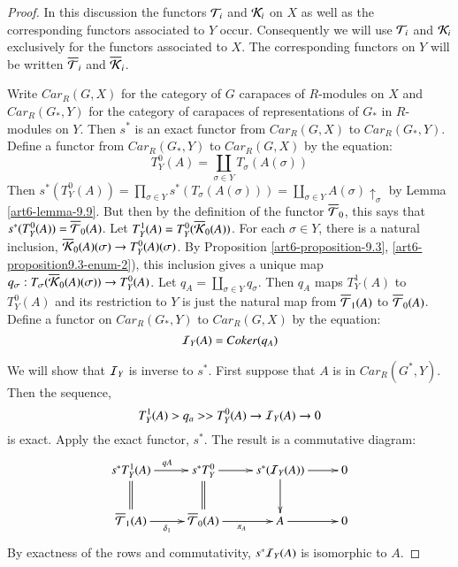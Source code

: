\begin{proof}
In this discussion the functors $\mathcal{T}_{i}$ and $\mathcal{K}_{i}$ on $X$ as well as the corresponding functors associated to $Y$ occur. Consequently we will use $\mathcal{T}_{i}$ and $\mathcal{K}_{i}$ exclusively for the functors associated to $X$. The corresponding functors on $Y$ will be written $\overline{\mathcal{T}}_{i}$ and $ \overline{\mathcal{K}}_{i}$.

Write $C ar_{R}(G, X)$ for the category of $G$ carapaces of $R$-modules on $X$ and $C ar_{R}(G_{*}, Y)$ for the category of carapaces of representations of $G_{*}$ in $R$-modules on $Y$. Then $s^{*}$ is an exact functor from $C ar_{R}(G, X)$ to $C ar_{R}(G_{*}, Y)$. Define a functor from $C ar_{R}(G_{*}, Y)$ to $C ar_{R}(G, X)$ by the equation:
\begin{equation}\label{art6-equation-9.13}
T_{Y}^{0}(A) = \coprod_{\sigma \in Y}T_{\sigma}(A(\sigma))
\end{equation}
Then $s^{*}(T_{Y}^{0}(A)) = \prod_{\sigma \in Y}s^{*}(T_{\sigma}(A(\sigma))) = \coprod_{\sigma \in Y}A(\sigma) \uparrow_{\sigma}$ by Lemma \ref{art6-lemma-9.9}. But then by the definition of the functor $\overline{\mathcal{T}}_{0}$, this says that $s^{*}(T_{Y}^{0}(A)) = \overline{\mathcal{T}}_{0}(A)$. Let $T_{Y}^{1}(A) = T_{Y}^{0}(\overline{\mathcal{K}}_{0}(A))$. For each $\sigma \in Y$, there is a natural inclusion, $\overline{\mathcal{K}}_{0}(A)(\sigma) \rightarrow T_{Y}^{0}(A)(\sigma)$. By Proposition \ref{art6-proposition-9.3}, \ref{art6-proposition9.3-enum-2}), this inclusion gives a unique map $q_{\sigma} : T_{\sigma}(\overline{\mathcal{K}}_{0}(A)(\sigma))\rightarrow T_{Y}^{0}(A)$. Let $q_{A}= \coprod_{\sigma \in Y} q_{\sigma}$. Then $q_{A}$ maps $T_{Y}^{1}(A)$ to $T_{Y}^{0}(A)$ and its restriction to $Y$ is just the natural map from $\overline{\mathcal{T}}_{1}(A)$ to $\overline{\mathcal{T}}_{0}(A)$. Define a functor on $C ar_{R}(G_{*}, Y)$ to $C ar_{R}(G, X)$ by the equation:
\begin{equation}\label{art6-eq-9.14}
\mathcal{I}_{Y}(A)= Coker(q_{A})
\end{equation}

We will show that $\mathcal{I}_{Y}$ is inverse to $s^{*}$. First suppose that $A$ is in $Car_{R}(G^{*}, Y)$. Then the sequence,
$$
T_{Y}^{1}(A) > q_{a}>>T_{Y}^{0}(A) \rightarrow \mathcal{I}_{Y}(A)\rightarrow 0
$$
is exact. Apply the exact functor, $s^{*}$. The result is a commutative diagram:
$$
\xymatrix{
s^{*}T_{Y}^{1}(A)\ar@{=}[d]\ar[r]^{qA} & s^{*}T_{Y}^{0}\ar@{=}[d] \ar [r] & s^{*}(\calI_{Y}(A)) \ar[r]\ar[d] & 0\\
\overline{\calT}_{1}(A) \ar [r]_{\delta_{1}} & \overline{\calT}_{0}(A) \ar[r]_{\pi_{A}} & A \ar [r] & 0
}
$$
By exactness of the rows and commutativity, $s^{*}\mathcal{I}_{Y}(A)$ is isomorphic to $A$.


\end{proof}
